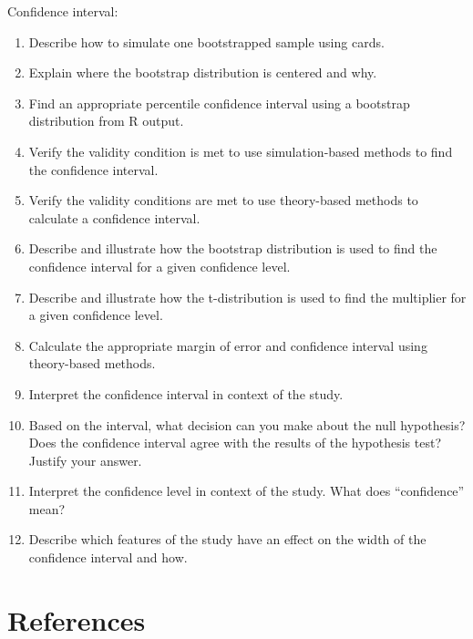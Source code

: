 \documentclass[
]{report}
\begin{document}
Confidence interval:

\begin{enumerate}
\def\labelenumi{\arabic{enumi}.}
\setcounter{enumi}{29}
\item
  Describe how to simulate one bootstrapped sample using cards.
\item
  Explain where the bootstrap distribution is centered and why.
\item
  Find an appropriate percentile confidence interval using a bootstrap distribution from R output.
\item
  Verify the validity condition is met to use simulation-based methods to find the confidence interval.
\item
  Verify the validity conditions are met to use theory-based methods to calculate a confidence interval.
\item
  Describe and illustrate how the bootstrap distribution is used to find the confidence interval for a given confidence level.
\item
  Describe and illustrate how the t-distribution is used to find the multiplier for a given confidence level.
\item
  Calculate the appropriate margin of error and confidence interval using theory-based methods.
\item
  Interpret the confidence interval in context of the study.
\item
  Based on the interval, what decision can you make about the null hypothesis? Does the confidence interval agree with the results of the hypothesis test? Justify your answer.
\item
  Interpret the confidence level in context of the study. What does ``confidence'' mean?
\item
  Describe which features of the study have an effect on the width of the confidence interval and how.
\end{enumerate}

\newpage

\chapter*{References}\label{references}
\end{document}
